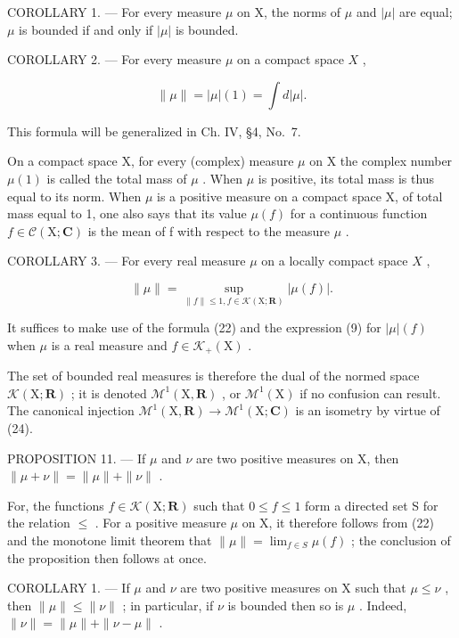 COROLLARY 1. --- For every measure \(\mu\) on X, the norms of \(\mu\) and \(|\mu|\) are equal; \(\mu\) is bounded if and only if \(|\mu|\) is bounded.

COROLLARY 2. --- For every measure \(\mu\) on a compact space \(X\) ,

\[
\| \mu \| = | \mu | (1) = \int d | \mu |.\tag{23}
\]

This formula will be generalized in Ch. IV, §4, No.~7.

On a compact space X, for every (complex) measure \(\mu\) on X the complex number \(\mu(1)\) is called the total mass of \(\mu\) . When \(\mu\) is positive, its total mass is thus equal to its norm. When \(\mu\) is a positive measure on a compact space X, of total mass equal to 1, one also says that its value \(\mu(f)\) for a continuous function \(f \in \mathcal{C}(\mathrm{X};\mathbf{C})\) is the mean of f with respect to the measure \(\mu\) .

COROLLARY 3. --- For every real measure \(\mu\) on a locally compact space \(X\) ,

\[
\| \mu \| = \sup _ {\| f \| \leqslant 1, f \in \mathcal{K} (\mathrm{X}; \mathbf {R})} | \mu (f) |.\tag{24}
\]

It suffices to make use of the formula (22) and the expression (9) for \(|\mu|(f)\) when \(\mu\) is a real measure and \(f \in \mathcal{K}_{+}(\mathrm{X})\) .

The set of bounded real measures is therefore the dual of the normed space \(\mathcal{K}(\mathrm{X};\mathbf{R})\) ; it is denoted \(\mathcal{M}^{1}(\mathrm{X},\mathbf{R})\) , or \(\mathcal{M}^{1}(\mathrm{X})\) if no confusion can result. The canonical injection \(\mathcal{M}^{1}(\mathrm{X},\mathbf{R})\to\mathcal{M}^{1}(\mathrm{X};\mathbf{C})\) is an isometry by virtue of (24).

PROPOSITION 11. --- If \(\mu\) and \(\nu\) are two positive measures on X, then \(\| \mu + \nu \| = \| \mu \| + \| \nu \|\) .

For, the functions \(f \in \mathcal{K}(\mathrm{X}; \mathbf{R})\) such that \(0 \leqslant f \leqslant 1\) form a directed set S for the relation \(\leqslant\) . For a positive measure \(\mu\) on X, it therefore follows from (22) and the monotone limit theorem that \(\| \mu \| = \lim_{f \in S} \mu(f)\) ; the conclusion of the proposition then follows at once.

COROLLARY 1. --- If \(\mu\) and \(\nu\) are two positive measures on X such that \(\mu \leqslant \nu\) , then \(\| \mu \| \leqslant \| \nu \|\) ; in particular, if \(\nu\) is bounded then so is \(\mu\) . Indeed, \(\| \nu \| = \| \mu \| + \| \nu - \mu \|\) .

